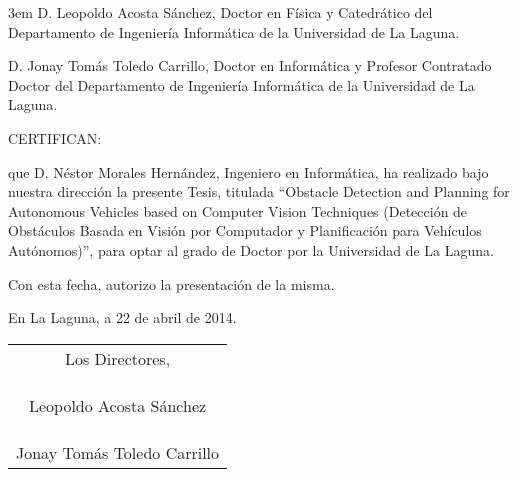 \cleardoublepage
\thispagestyle{empty}
\hfill\begin{minipage}[t]{0.85\textwidth}\parindent 3em
D. Leopoldo Acosta Sánchez, Doctor en Física y Catedrático del
Departamento de Ingeniería Informática de la Universidad de La Laguna.

D. Jonay Tomás Toledo Carrillo, Doctor en Informática y Profesor Contratado Doctor del
Departamento de Ingeniería Informática de la Universidad de La Laguna.
\null\vspace{\baselineskip}

CERTIFICAN:

\vspace{\baselineskip}
que D. Néstor Morales Hernández, Ingeniero en Informática, ha realizado bajo nuestra
dirección la presente Tesis, titulada ``Obstacle Detection and Planning for Autonomous Vehicles based on Computer Vision Techniques (Detección de Obstáculos Basada en Visión por Computador y Planificación para Vehículos Autónomos)'', para optar al
grado de Doctor por la Universidad de La Laguna.

\vspace{\baselineskip}
Con esta fecha, autorizo la presentación de la misma.

\vspace{\baselineskip}
\hfill En La Laguna, a 22 de abril de 2014.
\end{minipage}

\vspace{\baselineskip}
\hfill\begin{tabular}{c}
Los Directores, \\\\\\\\
Leopoldo Acosta Sánchez\\\\\\\\
Jonay Tomás Toledo Carrillo
\end{tabular}
